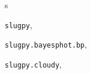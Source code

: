 \documentclass[letterpaper,10pt,english]{sphinxmanual}
\begin{document}
\renewcommand{\indexname}{Python Module Index}
\begin{theindex}
\def\bigletter#1{{\Large\sffamily#1}\nopagebreak\vspace{1mm}}
\bigletter{s}
\item {\texttt{slugpy}}, \pageref{slugpy:module-slugpy}
\item {\texttt{slugpy.bayesphot.bp}}, \pageref{bayesphot:module-slugpy.bayesphot.bp}
\item {\texttt{slugpy.cloudy}}, \pageref{cloudy:module-slugpy.cloudy}
\end{theindex}

\renewcommand{\indexname}{Index}
\printindex
\end{document}
